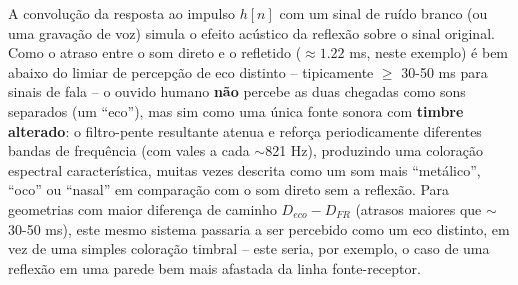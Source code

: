 \documentclass[a4paper,twoside,12pt]{article}
\begin{document}
	A convolução da resposta ao impulso $h[n]$ com um sinal de ruído branco (ou uma gravação de voz) simula o efeito acústico da reflexão sobre o sinal original.	Como o atraso entre o som direto e o refletido ($\approx 1.22$ ms, neste exemplo) é bem abaixo do limiar de percepção de eco distinto -- tipicamente $\geq$ 30-50 ms para sinais de fala -- o ouvido humano \textbf{não} percebe as duas chegadas como sons separados (um ``eco''), mas sim como uma única fonte sonora com \textbf{timbre alterado}: o filtro-pente resultante atenua e reforça periodicamente diferentes bandas de frequência (com vales a cada $\sim$821 Hz), produzindo uma coloração espectral característica, muitas vezes descrita como um som mais ``metálico'', ``oco'' ou ``nasal'' em comparação com o som direto sem a reflexão. Para geometrias com maior diferença de caminho $D_{eco}-D_{FR}$ (atrasos maiores que $\sim$30-50 ms), este mesmo sistema passaria a ser percebido como um eco distinto, em vez de uma simples coloração timbral -- este seria, por exemplo, o caso de uma reflexão em uma parede bem mais afastada da linha fonte-receptor.
	
\end{document}
